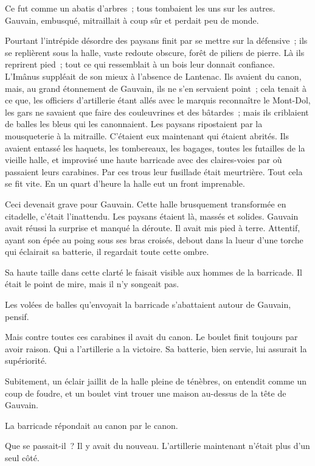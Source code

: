 \documentclass[french,twoside]{book} %
\begin{document}
Ce fut comme un abatis d’arbres ; tous tombaient les uns sur les autres. Gauvain, embusqué, mitraillait à coup sûr et perdait peu de monde.\par
Pourtant l’intrépide désordre des paysans finit par se mettre sur la défensive ; ils se replièrent sous la halle, vaste redoute obscure, forêt de piliers de pierre. Là ils reprirent pied ; tout ce qui ressemblait à un bois leur donnait confiance. L’Imânus suppléait de son mieux à l’absence de Lantenac. Ils avaient du canon, mais, au grand étonnement de Gauvain, ils ne s’en servaient point ; cela tenait à ce que, les officiers d’artillerie étant allés avec le marquis reconnaître le Mont-Dol, les gars ne savaient que faire des couleuvrines et des bâtardes ; mais ils criblaient de balles les bleus qui les canonnaient. Les paysans ripostaient par la mousqueterie à la mitraille. C’étaient eux maintenant qui étaient abrités. Ils avaient entassé les haquets, les tombereaux, les bagages, toutes les futailles de la vieille halle, et improvisé une haute barricade avec des claires-voies par où passaient leurs carabines. Par ces trous leur fusillade était meurtrière. Tout cela se fit vite. En un quart d’heure la halle eut un front imprenable.\par
Ceci devenait grave pour Gauvain. Cette halle brusquement transformée en citadelle, c’était l’inattendu. Les paysans étaient là, massés et solides. Gauvain avait réussi la surprise et manqué la déroute. Il avait mis pied à terre. Attentif, ayant son épée au poing sous ses bras croisés, debout dans la lueur  d’une torche qui éclairait sa batterie, il regardait toute cette ombre.\par
Sa haute taille dans cette clarté le faisait visible aux hommes de la barricade. Il était le point de mire, mais il n’y songeait pas.\par
Les volées de balles qu’envoyait la barricade s’abattaient autour de Gauvain, pensif.\par
Mais contre toutes ces carabines il avait du canon. Le boulet finit toujours par avoir raison. Qui a l’artillerie a la victoire. Sa batterie, bien servie, lui assurait la supériorité.\par
Subitement, un éclair jaillit de la halle pleine de ténèbres, on entendit comme un coup de foudre, et un boulet vint trouer une maison au-dessus de la tête de Gauvain.\par
La barricade répondait au canon par le canon.\par
Que se passait-il ? Il y avait du nouveau. L’artillerie maintenant n’était plus d’un seul côté.\par
\end{document}
